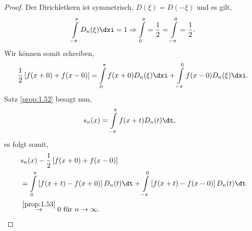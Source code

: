 \begin{proof}
Der Dirichletkern ist symmetrisch, $D(\xi) = D(-\xi)$ und es gilt,
\begin{align*}
\int\limits_{-\pi}^\pi D_n(\xi)\dxi = 1\Rightarrow \int\limits_{0}^\pi =
\frac{1}{2} = \int\limits_{-\pi}^0 =\frac{1}{2}.
\end{align*}
Wir können somit schreiben,
\begin{align*}
\frac{1}{2}\left[f(x+0)+f(x-0)\right] = \int\limits_0^\pi f(x+0)D_n(\xi)\dxi
 + \int\limits_{-\pi}^0 f(x-0)D_n(\xi)\dxi.
 \end{align*}
Satz \ref{prop:1.52} besagt nun,
\begin{align*}
&s_n(x) = \int\limits_{-\pi}^\pi f(x+t)D_n(t)\dt,
\end{align*}
es folgt somit,
\begin{align*}
&s_n(x) - \frac{1}{2}\left[f(x+0)+f(x-0)\right]\\
&= \int\limits_0^\pi \left[f(x+t) - f(x+0)\right]D_n(t)\dt
+ \int\limits_{-\pi}^0 \left[f(x+t) - f(x-0)\right]D_n(t)\dt\\
&\overset{\ref{prop:1.53}}{\to} 0 \text{ für } n\to\infty.\qedhere
\end{align*}
\end{proof}

